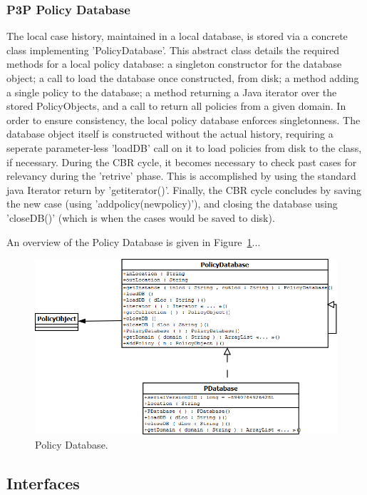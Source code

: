 \subsubsection{P3P Policy Database}
The local case history, maintained in a local database, is stored via a concrete class implementing 'PolicyDatabase'. This abstract class details the required methods for a local policy database: a singleton constructor for the database object; a call to load the database once constructed, from disk; a method adding a single policy to the database; a method returning a Java iterator over the stored PolicyObjects, and a call to return all policies from a given domain.
In order to ensure consistency, the local policy database enforces singletonness. The database object itself is constructed without the actual history, requiring a seperate parameter-less 'loadDB' call on it to load policies from disk to the class, if necessary.
During the CBR cycle, it becomes necessary to check past cases for relevancy during the 'retrive' phase. This is accomplished by using the standard java Iterator return by 'getiterator()'.
Finally, the CBR cycle concludes by saving the new case (using 'addpolicy(newpolicy)'), and closing the database using 'closeDB()' (which is when the cases would be saved to disk).

An overview of the Policy Database is given in Figure~\ref{pd_fig}...
\begin{figure}[htbp]
\begin{center}
\includegraphics[width = \textwidth]{DesignReport/uml/pd.png}
\caption{Policy Database.}
\label{pd_fig}
\end{center}
\end{figure}

\subsection{Interfaces}

